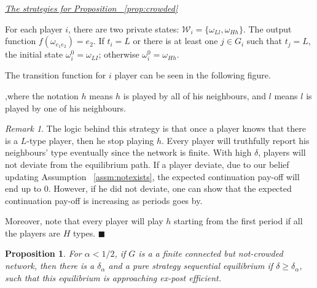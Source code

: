 \documentclass[12pt,letter]{article}
\newtheorem{proposition}{Proposition}[section]
\theoremstyle{remark}
\theoremstyle{remark}
\newtheorem*{remark}{Remark}
\theoremstyle{claim}
\begin{document}
\bigskip
\noindent\underline{\emph{The strategies for Proposition ~\ref{prop:crowded}}}

For each player $i$, there are two private states: $\mathcal{W}_i=\{\omega_{Ll},\omega_{Hh}\}$.  The output function $f(\omega_{e_1e_2})=e_2$.  If $t_i=L$ or there is at least one $j\in G_i$ such that $t_j=L$, the initial state $\omega^0_i=\omega_{LI}$; otherwise $\omega^0_i=\omega_{Hh}$. 

The transition function for $i$ player can be seen in the following figure. 

\begin{center}
\end{center}
,where the notation $h$ means $h$ is played by all of his neighbours, and $l$ means $l$ is played by one of his neighbours.

\bigskip

\begin{remark}
The logic behind this strategy is that once a player knows that there is a $L$-type player, then he stop playing $h$. Every player will truthfully report his neighbours' type eventually since the network is finite. With high $\delta$, players will not deviate from the equilibrium path. If a player deviate, due to our belief updating Assumption ~\ref{assm:notexists}, the expected continuation pay-off will end up to $0$. However, if he did not deviate, one can show that the expected continuation pay-off is increasing as periods goes by. 

Moreover, note that every player will play $h$ starting from the first period if all the players are $H$ types. $\blacksquare$
\end{remark}



\begin{proposition}
\label{prop:not_crowded}
For $\alpha<1/2$, if $G$ is a a finite connected but not-crowded network, then there is a $\delta_{\alpha}$ and a pure strategy sequential equilibrium if $\delta\geq\delta_{\alpha}$, such that this equilibrium is approaching ex-post efficient.
\end{proposition}
\end{document}
